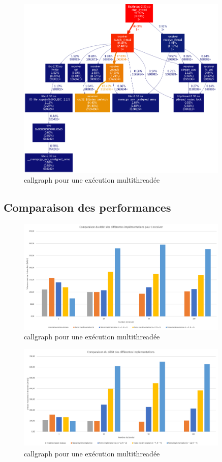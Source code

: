 \documentclass[../main.tex]{subfiles}
\begin{document}
\begin{figure}[H]
    \includegraphics[width=0.9\textwidth]{assets/callgraph.png}
    \caption{callgraph pour une exécution multithreadée}
    \label{sec:graph_mult}
\end{figure}

\newpage

\subsection{Comparaison des performances}

\begin{figure}[H]
    \includegraphics[width=0.9\textwidth]{assets/test_1.PNG}
    \caption{callgraph pour une exécution multithreadée}
    \label{sec:plot_1_recv}
\end{figure}

\begin{figure}[H]
    \includegraphics[width=0.9\textwidth]{assets/test_mul.PNG}
    \caption{callgraph pour une exécution multithreadée}
    \label{sec:plot_mul_recv}
\end{figure}
\end{document}
